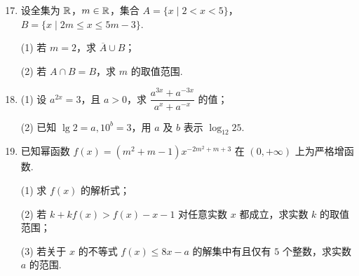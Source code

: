 \begin{enumerate}
\setcounter{enumi}{16}

\item 设全集为 $\mathbb{R}$，$m\in\mathbb{R}$，集合 $A=\{x\mid 2<x<5\}$，$B=\{x\mid 2m\leqslant x\leqslant 5m-3\}$.

(1) 若 $m=2$，求 $\overline{A}\cup B$；

(2) 若 $A\cap B=B$，求 $m$ 的取值范围.

\ifanswer
\solbegin
{}
\solend
\fi

\item (1) 设 $a^{2x}=3$，且 $a>0$，求 $\dfrac{a^{3x}+a^{-3x}}{a^x+a^{-x}}$ 的值；

(2) 已知 $\lg2=a, 10^b=3$，用 $a$ 及 $b$ 表示 $\log_{12}25$.

\ifanswer
\solbegin
{}
\solend
\fi

\item 已知幂函数 $f(x)=(m^2+m-1)x^{-2m^2+m+3}$ 在 $(0,+\infty)$ 上为严格增函数.

(1) 求 $f(x)$ 的解析式；

(2) 若 $k+kf(x)>f(x)-x-1$ 对任意实数 $x$ 都成立，求实数 $k$ 的取值范围；

(3) 若关于 $x$ 的不等式 $f(x)\leqslant8x-a$ 的解集中有且仅有 $5$ 个整数，求实数 $a$ 的范围.


\end{enumerate}
